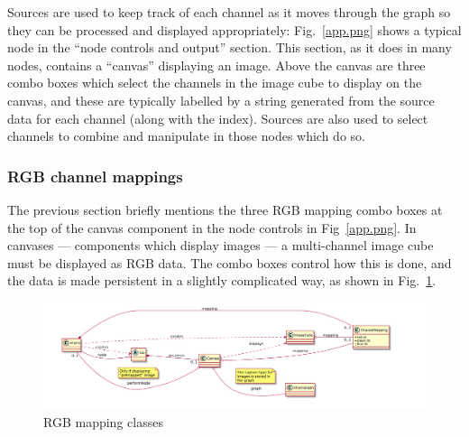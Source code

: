 Sources are used to keep track of each channel as it moves through the graph so they can be processed and displayed appropriately:
Fig.~\ref{app.png} shows a typical node in the ``node controls and output'' section. This section, as it does in many nodes,
contains a ``canvas'' displaying an image. Above the canvas are three combo boxes which select the channels in the image cube to display on the canvas,
and these are typically labelled by a string generated from the source data for each channel (along with the index). Sources are also used
to select channels to combine and manipulate in those nodes which do so.

\subsubsection{RGB channel mappings}
The previous section briefly mentions the three RGB mapping combo boxes at the
top of the canvas component in the node controls in Fig~\ref{app.png}. In
canvases --- components which display images --- a multi-channel image cube
must be displayed as RGB data. The combo boxes control how this is done, and
the data is made persistent in a slightly complicated way, as shown in Fig.~\ref{rgb.pdf}.

\begin{figure}[ht]
\center
\includegraphics[width=6in]{rgb.pdf}
\caption{RGB mapping classes}
\label{rgb.pdf}
\end{figure}

